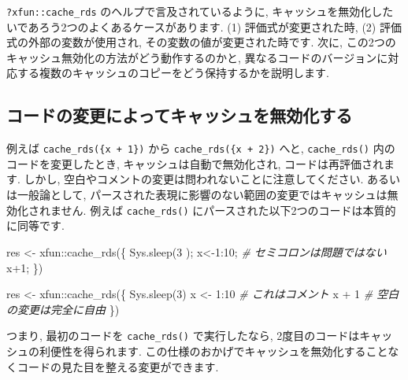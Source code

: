 \documentclass[
  11pt,
  lualatex,ja=standard,jafont=noto]{bxjsreport}
\newenvironment{Shaded}{\begin{snugshade}}{\end{snugshade}}
\newcommand{\CommentTok}[1]{\textcolor[rgb]{0.56,0.35,0.01}{\textit{#1}}}
\newcommand{\DecValTok}[1]{\textcolor[rgb]{0.00,0.00,0.81}{#1}}
\newcommand{\FunctionTok}[1]{\textcolor[rgb]{0.00,0.00,0.00}{#1}}
\newcommand{\NormalTok}[1]{#1}
\newcommand{\OtherTok}[1]{\textcolor[rgb]{0.56,0.35,0.01}{#1}}
\newcommand{\SpecialCharTok}[1]{\textcolor[rgb]{0.00,0.00,0.00}{#1}}
\begin{document}
\texttt{?xfun::cache\_rds} のヘルプで言及されているように, キャッシュを無効化したいであろう2つのよくあるケースがあります. (1) 評価式が変更された時, (2) 評価式の外部の変数が使用され, その変数の値が変更された時です. 次に, この2つのキャッシュ無効化の方法がどう動作するのかと, 異なるコードのバージョンに対応する複数のキャッシュのコピーをどう保持するかを説明します.

\hypertarget{ux30b3ux30fcux30c9ux306eux5909ux66f4ux306bux3088ux3063ux3066ux30adux30e3ux30c3ux30b7ux30e5ux3092ux7121ux52b9ux5316ux3059ux308b}{%
\subsection{コードの変更によってキャッシュを無効化する}\label{ux30b3ux30fcux30c9ux306eux5909ux66f4ux306bux3088ux3063ux3066ux30adux30e3ux30c3ux30b7ux30e5ux3092ux7121ux52b9ux5316ux3059ux308b}}

例えば \texttt{cache\_rds(\{x + 1\})} から \texttt{cache\_rds(\{x + 2\})} へと, \texttt{cache\_rds()} 内のコードを変更したとき, キャッシュは自動で無効化され, コードは再評価されます. しかし, 空白やコメントの変更は問われないことに注意してください. あるいは一般論として, パースされた表現に影響のない範囲の変更ではキャッシュは無効化されません. 例えば \texttt{cache\_rds()} にパースされた以下2つのコードは本質的に同等です.

\begin{Shaded}
\begin{Highlighting}[]
\NormalTok{res }\OtherTok{\textless{}{-}}\NormalTok{ xfun}\SpecialCharTok{::}\FunctionTok{cache\_rds}\NormalTok{(\{}
  \FunctionTok{Sys.sleep}\NormalTok{(}\DecValTok{3}\NormalTok{  );}
\NormalTok{  x}\OtherTok{\textless{}{-}}\DecValTok{1}\SpecialCharTok{:}\DecValTok{10}\NormalTok{;  }\CommentTok{\# セミコロンは問題ではない}
\NormalTok{  x}\SpecialCharTok{+}\DecValTok{1}\NormalTok{;}
\NormalTok{\})}

\NormalTok{res }\OtherTok{\textless{}{-}}\NormalTok{ xfun}\SpecialCharTok{::}\FunctionTok{cache\_rds}\NormalTok{(\{}
  \FunctionTok{Sys.sleep}\NormalTok{(}\DecValTok{3}\NormalTok{)}
\NormalTok{  x }\OtherTok{\textless{}{-}} \DecValTok{1}\SpecialCharTok{:}\DecValTok{10}  \CommentTok{\# これはコメント}
\NormalTok{  x }\SpecialCharTok{+}
    \DecValTok{1}  \CommentTok{\# 空白の変更は完全に自由}
\NormalTok{\})}
\end{Highlighting}
\end{Shaded}

つまり, 最初のコードを \texttt{cache\_rds()} で実行したなら, 2度目のコードはキャッシュの利便性を得られます. この仕様のおかげでキャッシュを無効化することなくコードの見た目を整える変更ができます.
\end{document}
